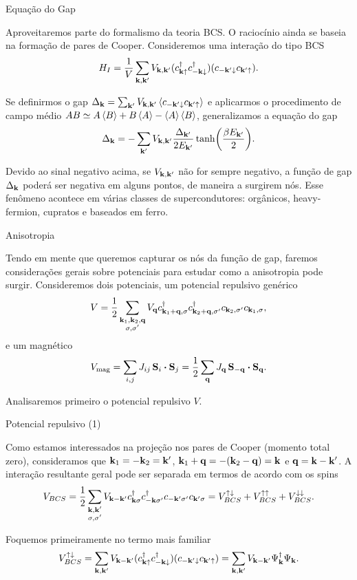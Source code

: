 \documentclass[aspectratio=169,xcolor={table,dvipsnames,usenames}]{beamer}
\begin{document}
\begin{frame}{Equação do Gap}

Aproveitaremos parte do formalismo da teoria BCS. O raciocínio ainda se baseia na formação de pares de Cooper. Consideremos uma interação do tipo BCS
$$
H_I =
\frac{1}{V} \sum_{\vb{k},\vb{k}'} V_{\vb{k},\vb{k}'} (c_{\vb{k}\uparrow}^\dagger c_{-\vb{k}\downarrow}^\dagger) (c_{-\vb{k}'\downarrow} c_{\vb{k}'\uparrow}).
$$

Se definirmos o gap $\Delta_{\k} = \sum_{\k'} V_{\k,\k'} \ev{c_{-\k'\down} c_{\k'\up}}$ e aplicarmos o procedimento de campo médio $AB \simeq A\ev{B} + B\ev{A} - \ev{A}\ev{B}$, generalizamos a equação do gap
\begin{equation} \label{eq:gapeq}
\Delta_{\vb{k}} = - \sum_{\vb{k}'} V_{\vb{k},\vb{k}'} \frac{\Delta_{\vb{k}'}}{2 E_{\vb{k}'}} \tanh(\frac{\beta E_{\vb{k}'}}{2}).
\end{equation}

Devido ao sinal negativo acima, se $V_{\vb{k},\vb{k}'}$ não for sempre negativo, a função de gap $\Delta_{\vb{k}}$ poderá ser negativa em alguns pontos, de maneira a surgirem nós. Esse fenômeno acontece em várias classes de supercondutores: orgânicos, heavy-fermion, cupratos e baseados em ferro.

\end{frame}

\begin{frame}{Anisotropia}

Tendo em mente que queremos capturar os nós da função de gap, faremos considerações gerais sobre potenciais para estudar como a anisotropia pode surgir. Consideremos dois potenciais, um potencial repulsivo genérico
$$
V = \frac{1}{2} \sum_{\substack{\vb{k}_1,\vb{k}_2,\vb{q} \\ \sigma, \sigma'}} V_{\vb{q}} c_{\vb{k}_1+\vb{q},\sigma}^\dagger c_{\vb{k}_2+\vb{q},\sigma'}^\dagger c_{\vb{k}_2,\sigma'} c_{\vb{k}_1,\sigma},
$$
e um magnético
$$
V_{\text{mag}} = \sum_{i,j} J_{ij} \, \vb{S}_i \vdot \vb{S}_j = \frac{1}{2} \sum_{\q} J_{\q} \, \vb{S}_{-\q} \vdot \vb{S}_{\q}.
$$

\n

Analisaremos primeiro o potencial repulsivo $V$.

\end{frame}

\begin{frame}{Potencial repulsivo (1)}

Como estamos interessados na projeção nos pares de Cooper (momento total zero), consideramos que $\vb{k}_1 = -\vb{k}_2 = \vb{k}'$, $\vb{k}_1 + \vb{q} = -(\vb{k}_2 - \vb{q}) = \vb{k}$ e $\vb{q} = \vb{k} - \vb{k}'$. A interação resultante geral pode ser separada em termos de acordo com os spins
$$
V_{BCS} = \frac{1}{2} \sum_{\substack{\vb{k},\vb{k}' \\ \sigma, \sigma'}} V_{\vb{k}-\vb{k}'} c_{\vb{k}\sigma}^\dagger c_{-\vb{k}\sigma'}^\dagger c_{-\vb{k}'\sigma'}c_{\vb{k}'\sigma} =
V_{BCS}^{\uparrow\downarrow} + V_{BCS}^{\uparrow\uparrow} + V_{BCS}^{\downarrow\downarrow}.
$$

Foquemos primeiramente no termo mais familiar
$$
V_{BCS}^{\uparrow\downarrow} = \sum_{\vb{k},\vb{k}'} V_{\vb{k}-\vb{k}'} (c_{\vb{k}\uparrow}^\dagger c_{-\vb{k}\downarrow}^\dagger) (c_{-\vb{k}'\downarrow} c_{\vb{k}'\uparrow}) =
\sum_{\vb{k},\vb{k}'} V_{\vb{k}-\vb{k}'} \Psi_{\vb{k}}^\dagger \Psi_{\vb{k}}.
$$

\end{frame}
\end{document}
